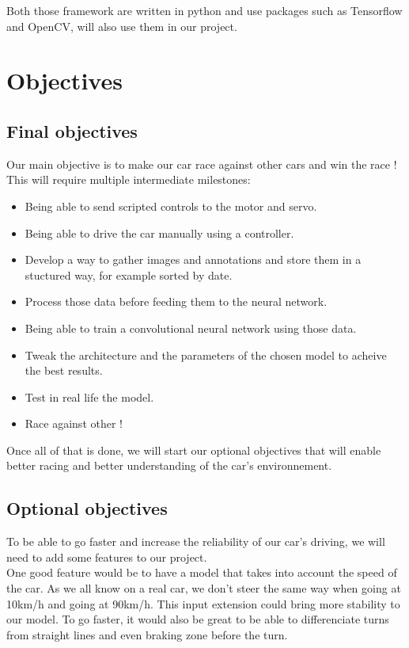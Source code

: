 \documentclass[12pt]{article}
\begin{document}
Both those framework are written in python and use packages such as Tensorflow and OpenCV, will also use them in our project.

\section{Objectives}

\subsection{Final objectives}
Our main objective is to make our car race against other cars and win the race !
This will require multiple intermediate milestones:
\begin{itemize}
\item Being able to send scripted controls to the motor and servo.
\item Being able to drive the car manually using a controller.
\item Develop a way to gather images and annotations and store them in a stuctured way, for example sorted by date.
\item Process those data before feeding them to the neural network.
\item Being able to train a convolutional neural network using those data.
\item Tweak the architecture and the parameters of the chosen model to acheive the best results.
\item Test in real life the model.
\item Race against other !
\end{itemize}
Once all of that is done, we will start our optional objectives that will enable better racing and better understanding of the car's environnement.

\subsection{Optional objectives}
To be able to go faster and increase the reliability of our car's driving, we will need to add some features to our project. \\

One good feature would be to have a model that takes into account the speed of the car. As we all know on a real car, we don't steer the same way when going at 10km/h and going at 90km/h. This input extension could bring more stability to our model.
To go faster, it would also be great to be able to differenciate turns from straight lines and even braking zone before the turn. \\
\end{document}
